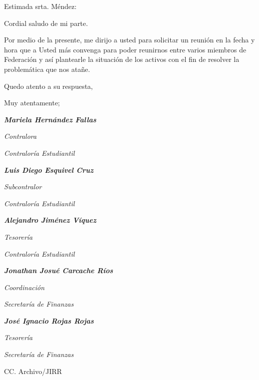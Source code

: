 \documentclass[12pt]{article}
\begin{document}
\noindent Estimada srta. Méndez:\par
Cordial saludo de mi parte.\par
Por medio de la presente, me dirijo a usted para solicitar un reunión en la fecha y hora que a Usted más convenga para poder reunirnos entre varios miembros de Federación y así plantearle la situación de los activos con el fin de resolver la problemática que nos atañe.\par
Quedo atento a su respuesta,\par
Muy atentamente;
\bigskip\bigskip
\begin{spacing}{1}
\begin{multicols}{2}
\textit{\textbf{Mariela Hernández Fallas}}\par
\textit{Contralora}\par 
\textit{Contraloría Estudiantil}\par
\bigskip\bigskip
\textit{\textbf{Luis Diego Esquivel Cruz}}\par
\textit{Subcontralor}\par 
\textit{Contraloría Estudiantil}\par 
\bigskip\bigskip
\textit{\textbf{Alejandro Jiménez Víquez}}\par
\textit{Tesorería}\par 
\textit{Contraloría Estudiantil}\par
\bigskip\bigskip
\textit{\textbf{Jonathan Josué Carcache Ríos}}\par
\textit{Coordinación}\par 
\textit{Secretaría de Finanzas}\par 
\bigskip\bigskip
\textit{\textbf{José Ignacio Rojas Rojas}}\par
\textit{Tesorería}\par 
\textit{Secretaría de Finanzas}\par 
\bigskip\bigskip
\textit{\textbf{}}\par
\textit{}\par 
\textit{}

\end{multicols}
\end{spacing}
\medskip
\begin{flushleft}\begin{spacing}{1}
 \scriptsize{CC. Archivo/JIRR
 

 }
\end{spacing}\end{flushleft}
%
%
\end{document}
